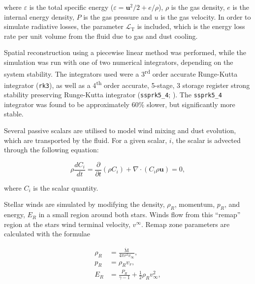\documentclass[fleqn,usenatbib]{mnras}
\newcommand{\ts}{\textsuperscript}
\newcommand{\rms}[1]{\ensuremath{_{\text{#1}}}}
\newcommand{\mdot}{\dot{\text{M}}}
\begin{document}
\noindent
where $\varepsilon$ is the total specific energy ($\varepsilon = \boldsymbol{u}^2/2 + e/\rho $), $\rho$ is the gas density, $e$ is the internal energy density, $P$ is the gas pressure and $u$ is the gas velocity.
In order to simulate radiative losses, the parameter $\mathcal{L}\rms{T}$ is included, which is the energy loss rate per unit volume from the fluid due to gas and dust cooling.

Spatial reconstruction using a piecewise linear method was performed, while the simulation was run with one of two numerical integrators, depending on the system stability.
The integrators used were a 3\ts{rd} order accurate Runge-Kutta integrator (\texttt{rk3}), as well as a 4\ts{th} order accurate, 5-stage, 3 storage register strong stability preserving Runge-Kutta integrator (\texttt{ssprk5\_4}; \citet{ruuthHighOrderStrongStabilityPreservingRungeKutta2005}).
The \texttt{ssprk5\_4} integrator was found to be approximately 60\% slower, but significantly more stable.

Several passive scalars are utilised to model wind mixing and dust evolution, which are transported by the fluid.
For a given scalar, $i$, the scalar is advected through the following equation:


\begin{equation}
  \rho \frac{dC_i}{dt} = \frac{\partial}{\partial t} \left( \rho C_i \right) + \nabla \cdot \left( C_i \rho \mathbf{u} \right) = 0 ,  
\end{equation}

\noindent
where $C_i$ is the scalar quantity.


Stellar winds are simulated by modifying the density, $\rho_R$, momentum, $p_R$, and energy, $E_R$ in a small region around both stars.
Winds flow from this ``remap'' region at the stars wind terminal velocity, $v^\infty$. Remap zone parameters are calculated with the formulae

\begin{subequations}
  \begin{align}
    \rho_R & = \frac{\mdot}{4 \pi r^2 v_\infty} , \\
    p_R    & = \rho_R v_{r} , \\
    E_R    & = \frac{P_R}{\gamma - 1} + \frac{1}{2} \rho_R v_\infty^2 ,
  \end{align}
\end{subequations}
\end{document}

